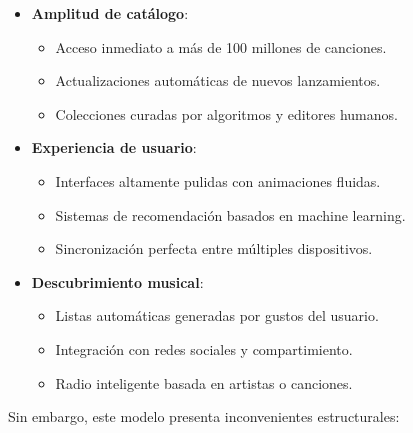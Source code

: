 \documentclass[11pt, a4paper]{article}
\begin{document}
  \begin{itemize}
      \item \textbf{Amplitud de catálogo}:
      \begin{itemize}
          \item Acceso inmediato a más de 100 millones de canciones.
          \item Actualizaciones automáticas de nuevos lanzamientos.
          \item Colecciones curadas por algoritmos y editores humanos.
      \end{itemize}
      
      \item \textbf{Experiencia de usuario}:
      \begin{itemize}
          \item Interfaces altamente pulidas con animaciones fluidas.
          \item Sistemas de recomendación basados en machine learning.
          \item Sincronización perfecta entre múltiples dispositivos.
      \end{itemize}
      
      \item \textbf{Descubrimiento musical}:
      \begin{itemize}
          \item Listas automáticas generadas por gustos del usuario.
          \item Integración con redes sociales y compartimiento.
          \item Radio inteligente basada en artistas o canciones.
      \end{itemize}
  \end{itemize}

  Sin embargo, este modelo presenta inconvenientes estructurales:
\end{document}
